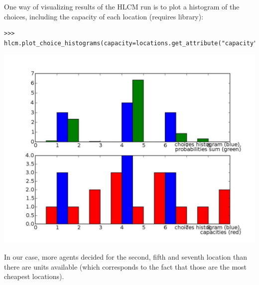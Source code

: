 One way of visualizing results of the HLCM run is to plot a histogram \histogramindex of the
choices, including the capacity of each location (requires 
library):
\histogramindex
\begin{verbatim}
>>> hlcm.plot_choice_histograms(capacity=locations.get_attribute("capacity"))
\end{verbatim}
\begin{center}
\includegraphics[scale=0.2, angle=0]{images/hlcmhist.pdf}
\end{center}
In our case, more agents decided for the second, fifth and seventh location than there
are units available (which corresponds to the fact that those are the most cheapest locations).

